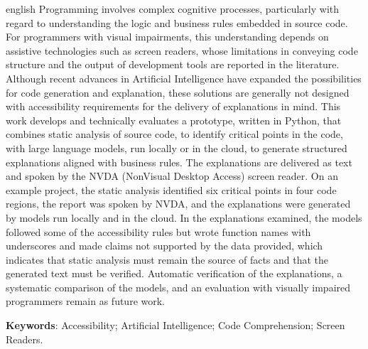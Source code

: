 \documentclass[
    12pt,                   %
    openright,              %
    oneside,                %
    a4paper,                %
    sumario=tradicional,    %
    english,                %
    brazil,                 %
    ]{abntex2}
\begin{document}
\begin{resumo}[Abstract]
\begin{otherlanguage*}{english}
  \noindent
  Programming involves complex cognitive processes, particularly with regard to understanding the logic and business rules embedded in source code. For programmers with visual impairments, this understanding depends on assistive technologies such as screen readers, whose limitations in conveying code structure and the output of development tools are reported in the literature. Although recent advances in Artificial Intelligence have expanded the possibilities for code generation and explanation, these solutions are generally not designed with accessibility requirements for the delivery of explanations in mind. This work develops and technically evaluates a prototype, written in Python, that combines static analysis of source code, to identify critical points in the code, with large language models, run locally or in the cloud, to generate structured explanations aligned with business rules. The explanations are delivered as text and spoken by the NVDA (NonVisual Desktop Access) screen reader. On an example project, the static analysis identified six critical points in four code regions, the report was spoken by NVDA, and the explanations were generated by models run locally and in the cloud. In the explanations examined, the models followed some of the accessibility rules but wrote function names with underscores and made claims not supported by the data provided, which indicates that static analysis must remain the source of facts and that the generated text must be verified. Automatic verification of the explanations, a systematic comparison of the models, and an evaluation with visually impaired programmers remain as future work.
  \vspace{\onelineskip}

  \noindent
  \textbf{Keywords}: Accessibility; Artificial Intelligence; Code Comprehension; Screen Readers.
 \end{otherlanguage*}
\end{resumo}

\listoffigures*
\cleardoublepage

\cleardoublepage

\end{document}
